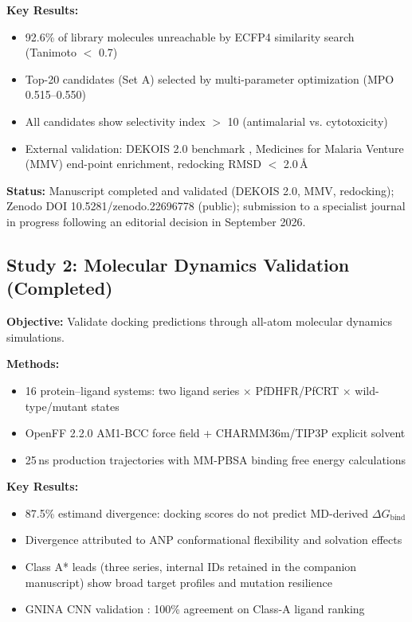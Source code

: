 \documentclass[11pt,a4paper]{article}
\begin{document}
\textbf{Key Results:}
\begin{itemize}
    \item 92.6\% of library molecules unreachable by ECFP4 similarity search (Tanimoto $<$ 0.7)
    \item Top-20 candidates (Set A) selected by multi-parameter optimization (MPO 0.515--0.550)
    \item All candidates show selectivity index $>$ 10 (antimalarial vs. cytotoxicity)
    \item External validation: DEKOIS 2.0 benchmark \cite{bauer2013}, Medicines for Malaria Venture (MMV) end-point enrichment, redocking RMSD $<$ 2.0\,\AA
\end{itemize}

\textbf{Status:} Manuscript completed and validated (DEKOIS 2.0, MMV, redocking); Zenodo DOI 10.5281/zenodo.22696778 (public); submission to a specialist journal in progress following an editorial decision in September 2026.

\subsection{Study 2: Molecular Dynamics Validation (Completed)}

\textbf{Objective:} Validate docking predictions through all-atom molecular dynamics simulations.

\textbf{Methods:}
\begin{itemize}
    \item 16 protein--ligand systems: two ligand series $\times$ PfDHFR/PfCRT $\times$ wild-type/mutant states
    \item OpenFF 2.2.0 AM1-BCC force field + CHARMM36m/TIP3P explicit solvent
    \item 25\,ns production trajectories with MM-PBSA binding free energy calculations
\end{itemize}

\textbf{Key Results:}
\begin{itemize}
    \item 87.5\% estimand divergence: docking scores do not predict MD-derived $\Delta G_{\text{bind}}$
    \item Divergence attributed to ANP conformational flexibility and solvation effects
    \item Class A* leads (three series, internal IDs retained in the companion manuscript) show broad target profiles and mutation resilience
    \item GNINA CNN validation \cite{mcnutt2021}: 100\% agreement on Class-A ligand ranking
\end{itemize}
\end{document}
